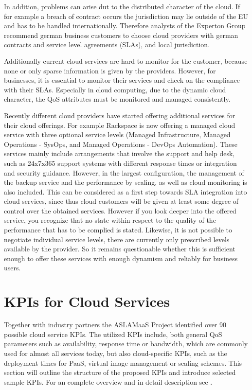 In addition, problems can arise dut to the distributed character of the cloud. If for example a breach of contract occurs the jurisdiction may lie outside of the EU and has to be handled internationally. Therefore analysts of the Experton Group \cite{Experton} recommend german business customers to choose cloud providers with german contracts and service level agreements (SLAs), and local jurisdiction. 

Additionally current cloud services are hard to monitor for the customer, because none or only sparse information is given by the providers. However, for businesses, it is essential to monitor their services and check on the compliance with their SLAs. Especially in cloud computing, due to the dynamic cloud character, the QoS attributes must be monitored and managed consistently.\cite{wsla}



Recently different cloud providers have started offering additional services for their cloud offerings. For example Rackspace\cite{rackspace15} is now offering a managed cloud service with three optional service levels (Managed Infrastructure, Managed Operations - SysOps, and Managed Operations - DevOps Automation). These services mainly include arrangements that involve the support and help desk, such as  24x7x365 support systems with different response times or integration and security guidance. However, in the largest configuration, the management of the backup service  and the performance by scaling, as well as cloud monitoring is also included. This can be considered as a first step towards SLA integration into cloud services, since thus cloud customers will be given at least some degree of control over the obtained services. However if you look deeper into the offered service, you recognize that no state within respect to the quality of the performance that has to be complied is stated. Likewise, it is not possible to negotiate individual service levels, there are currently only prescribed levels available by the provider. So it remains questionable whether this is sufficient enough to offer these services with enough dynamism and reliably for business users.




\section{KPIs for Cloud Services} \label{Cloud KPIs}
Together with industry partners the ASLAMaaS Project \cite{ASLAMaaS} identified over 90 possible cloud service KPIs.  The utilized KPIs include, both general QoS parameters such as availability, response time or bandwidth, which are commonly used for almost all services today, but also cloud-specific KPIs, such as the deployment-times for PaaS, virtual image management or scaling schemes. This section will outline the structure of the proposed KPIs and introduce selected sample KPIs. For an complete overview and in detail description see \cite{ASLAMaaSDoku}.

